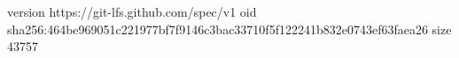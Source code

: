 version https://git-lfs.github.com/spec/v1
oid sha256:464be969051c221977bf7f9146c3bac33710f5f122241b832e0743ef63faea26
size 43757
